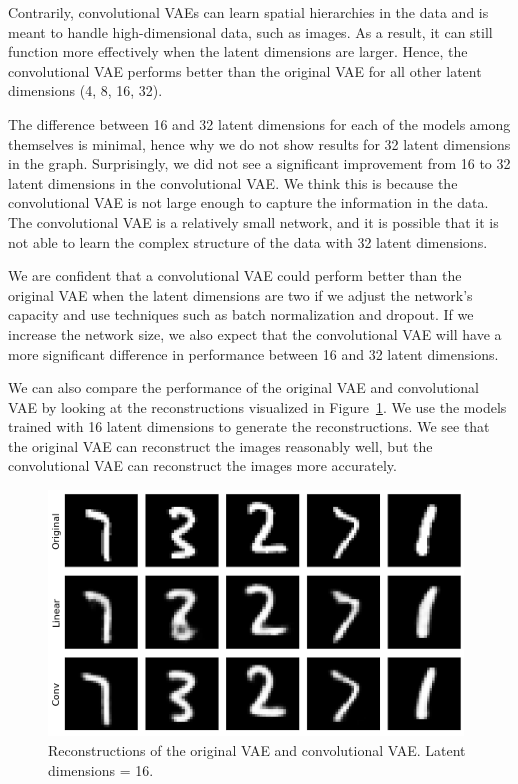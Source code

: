Contrarily, convolutional VAEs can learn spatial hierarchies in the data and is meant to handle high-dimensional data, such as images. As a result, it can still function more effectively when the latent dimensions are larger. Hence, the convolutional VAE performs better than the original VAE for all other latent dimensions (4, 8, 16, 32).

The difference between 16 and 32 latent dimensions for each of the models among themselves is minimal, hence why we do not show results for 32 latent dimensions in the graph. Surprisingly, we did not see a significant improvement from 16 to 32 latent dimensions in the convolutional VAE. We think this is because the convolutional VAE is not large enough to capture the information in the data. The convolutional VAE is a relatively small network, and it is possible that it is not able to learn the complex structure of the data with 32 latent dimensions.

We are confident that a convolutional VAE could perform better than the original VAE when the latent dimensions are two if we adjust the network's capacity and use techniques such as batch normalization and dropout. If we increase the network size, we also expect that the convolutional VAE will have a more significant difference in performance between 16 and 32 latent dimensions.

We can also compare the performance of the original VAE and convolutional VAE by looking at the reconstructions visualized in Figure~\ref{fig:reconstructions}. We use the models trained with 16 latent dimensions to generate the reconstructions. We see that the original VAE can reconstruct the images reasonably well, but the convolutional VAE can reconstruct the images more accurately.


\begin{figure}[h]
    \centering
    \includegraphics[width=11cm]{images/reconstructions.png}
    \setlength{\belowcaptionskip}{-10pt}
    \caption{Reconstructions of the original VAE and convolutional VAE. Latent dimensions = 16.}
    \label{fig:reconstructions}
\end{figure}

